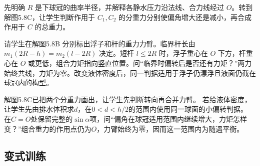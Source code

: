 \documentclass[UTF8,fontset=fandol,a4paper,11pt]{ctexart}
\begin{document}
先明确 $R$ 是下球冠的曲率半径，并解释各静水压力沿法线、合力线经过 $O$。转到解图5.8C，让学生判断作用于 $C_1,C_2$ 的分重力分别使偏角增大还是减小，再合成作用于 $C$ 的总重力。

请学生在解图5.8B 分别标出浮子和杆的重力力臂。临界杆长由 $m_1(2R-h)=m_2(l-2R)$ 决定。短杆 $l\le2R$ 时，浮子重心在 $O$ 下方，杆重心在 $O$ 或更低，组合力矩指向竖直位置。问“临界时偏转后是否还有力矩？”两力始终共线，力矩为零。改变液体密度后，同一判据适用于浮子仍漂浮且液面仍截在球冠内的构型。

解图5.8C已把两个分重力画出，让学生先判断转向再合并力臂。
若给液体密度，让学生先由排水体积求$d$，在$0<d<h/2$的范围内使用同一球面的小偏转判据。
在$C=O$处保留完整的$\sin\alpha$项，问“偏角在球冠适用范围内继续增大，力矩怎样变？”组合重力的作用点仍为$O$，力臂始终为零，因而这一范围内为随遇平衡。



\subsection*{变式训练}
\end{document}
